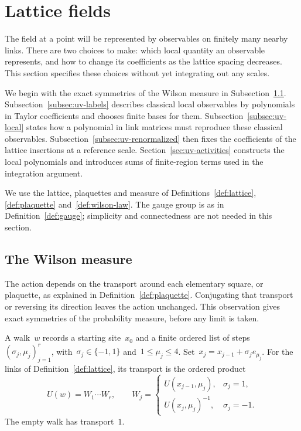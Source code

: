 \section{Lattice fields}\label{sec:uv-lattice}

The field at a point will be represented by observables on finitely many nearby links.
There are two choices to make: which local quantity an observable represents, and how to change its coefficients as the lattice spacing decreases.
This section specifies these choices without yet integrating out any scales.

We begin with the exact symmetries of the Wilson measure in Subsection~\ref{subsec:uv-law}.
Subsection~\ref{subsec:uv-labels} describes classical local observables by polynomials in Taylor coefficients and chooses finite bases for them.
Subsection~\ref{subsec:uv-local} states how a polynomial in link matrices must reproduce these classical observables.
Subsection~\ref{subsec:uv-renormalized} then fixes the coefficients of the lattice insertions at a reference scale.
Section~\ref{sec:uv-activities} constructs the local polynomials and introduces sums of finite-region terms used in the integration argument.

We use the lattice, plaquettes and measure of Definitions~\ref{def:lattice}, \ref{def:plaquette} and~\ref{def:wilson-law}.
The gauge group is as in Definition~\ref{def:gauge}; simplicity and connectedness are not needed in this section.

\subsection{The Wilson measure}\label{subsec:uv-law}

The action depends on the transport around each elementary square, or plaquette, as explained in Definition~\ref{def:plaquette}.
Conjugating that transport or reversing its direction leaves the action unchanged.
This observation gives exact symmetries of the probability measure, before any limit is taken.

\begin{definition}\label{def:uv-walks}
A walk~$w$ records a starting site~$x_0$ and a finite ordered list of steps~$(\sigma_j,\mu_j)_{j=1}^r$, with~$\sigma_j\in\{-1,1\}$ and~$1\le\mu_j\le4$.
Set~$x_j=x_{j-1}+\sigma_je_{\mu_j}$.
For the links of Definition~\ref{def:lattice}, its transport is the ordered product
\begin{equation}\label{eq:uv-walk-transport}
 U(w)=W_1\cdots W_r,\qquad
 W_j=\begin{cases}
 U(x_{j-1},\mu_j),&\sigma_j=1,\\
 U(x_j,\mu_j)^{-1},&\sigma_j=-1.
 \end{cases}
\end{equation}
The empty walk has transport~$1$.
\end{definition}

